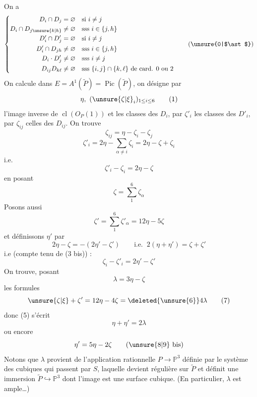 On a
\[
\left\{\begin{aligned}
D_i\cap D_j&=\varnothing &&\text{si }i\ne j\\
D_i\cap D_{j\unsure{k|h}}&\ne\varnothing &&\text{sss }i\in\{j,h\}\\
D'_i\cap D'_j&=\varnothing &&\text{si }i\ne j\\
D'_i\cap D_{jh}&\ne\varnothing &&\text{sss }i\in\{j,h\}\\
D_i\cdot D'_j&\ne\varnothing &&\text{sss }i\ne j\\
D_{ij}D_{k\ell}&\ne\varnothing &&\text{sss }\{i,j\}\cap\{k,\ell\}\text{ de card. }0\text{ ou }2
\end{aligned}\right.\tag*{(\unsure{0|$\ast$})}
\]
On calcule dans $E=A^1(\widetilde P)=\operatorname{Pic}(\widetilde P)$, on désigne par
\[
\eta,\ (\unsure{\zeta|\xi}_i)_{1\le i\le6}\tag*{(1)}
\]
l'image inverse de $\operatorname{cl}(O_P(1))$ et les classes des $D_i$, par $\zeta'_i$ les classes des $D'_i$, par $\zeta_{ij}$ celles des $D_{ij}$. On trouve
\[
\zeta_{ij}=\eta-\zeta_i-\zeta_j\tag*{(2)}
\]
\[
\zeta'_i=2\eta-\sum_{\alpha\ne i}\zeta_i=2\eta-\zeta+\zeta_i\tag*{(3)}
\]
i.e.
\[
\zeta'_i-\zeta_i=2\eta-\zeta\tag*{(3 bis)}
\]
en posant
\[
\zeta=\sum_1^6\zeta_\alpha\tag*{(4)}
\]
Posons aussi
\[
\zeta'=\sum_1^6\zeta'_\alpha=12\eta-5\zeta\tag*{(4')}
\]
et définissons $\eta'$ par
\[
2\eta-\zeta=-(2\eta'-\zeta')\qquad\text{i.e. }\ 2(\eta+\eta')=\zeta+\zeta'\tag*{(5)}
\]
i.e (compte tenu de (3 bis)) :
\[
\zeta_i-\zeta'_i=2\eta'-\zeta'\tag*{(5 bis)}
\]
On trouve, posant
\[
\lambda=3\eta-\zeta\tag*{(6)}
\]
les formules
\[
\unsure{\zeta|\xi}+\zeta'=12\eta-4\zeta=\deleted{\unsure{6}}4\lambda\tag*{(7)}
\]
donc (5) s'écrit  
\[
\eta+\eta'=2\lambda\tag*{(8)}
\]
ou encore
\[
\eta'=5\eta-2\zeta\tag*{(\unsure{8|9} bis)}
\]
Notons que $\lambda$ provient de l'application rationnelle $P\longrightarrow\mathbb P^3$ définie par le système des cubiques qui passent par $S$, laquelle devient régulière sur $\widetilde P$ et définit une immersion $\widetilde P\hookrightarrow\mathbb P^3$ dont l'image est une surface cubique. (En particulier, $\lambda$ est ample\ldots) 


